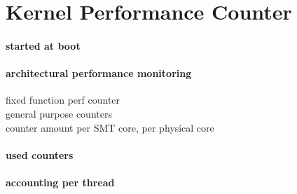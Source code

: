 \section{Kernel Performance Counter}
\label{impl:perfcounter}

\paragraph{started at boot}
\paragraph{architectural performance monitoring}
fixed function perf counter \\
general purpose counters \\
counter amount per SMT core, per physical core \\

\paragraph{used counters}
\paragraph{accounting per thread}
